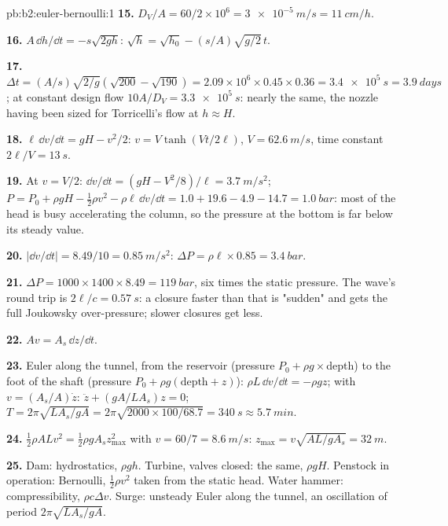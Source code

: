 \begin{solution}{pb:b2:euler-bernoulli:1}
\textbf{15.} $D_V/A = 60/2 \times 10^6 = \qty{3e-5}{m/s} = \qty{11}{cm/h}$.

\textbf{16.} $A\,\dd h/\dd t = -s\sqrt{2gh}$: $\sqrt h = \sqrt{h_0} - (s/A)\sqrt{g/2}\,t$.

\textbf{17.} $\Delta t = (A/s)\sqrt{2/g}(\sqrt{200} - \sqrt{190}) = 2.09 \times 10^6 \times
0.45 \times 0.36 = \qty{3.4e5}{s} = \qty{3.9}{days}$; at constant design flow
$10A/D_V = \qty{3.3e5}{s}$: nearly the same, the nozzle having been sized
for Torricelli's flow at $h \approx H$.

\textbf{18.} $\ell\,\dd v/\dd t = gH - v^2/2$: $v = V\tanh(Vt/2\ell)$, $V = \qty{62.6}{m/s}$,
time constant $2\ell/V = \qty{13}{s}$.

\textbf{19.} At $v = V/2$: $\dd v/\dd t = (gH - V^2/8)/\ell = \qty{3.7}{m/s^2}$;
$P = P_0 + \rho gH - \tfrac12\rho v^2 - \rho\ell\,\dd v/\dd t = 1.0 + 19.6 - 4.9 - 14.7
= \qty{1.0}{bar}$: most of the head is busy accelerating the column, so
the pressure at the bottom is far below its steady value.

\textbf{20.} $|\dd v/\dd t| = 8.49/10 = \qty{0.85}{m/s^2}$: $\Delta P = \rho\ell \times 0.85 =
\qty{3.4}{bar}$.

\textbf{21.} $\Delta P = 1000 \times 1400 \times 8.49 = \qty{119}{bar}$, six times the
static pressure. The wave's round trip is $2\ell/c = \qty{0.57}{s}$: a
closure faster than that is "sudden" and gets the full Joukowsky
over-pressure; slower closures get less.

\textbf{22.} $Av = A_s\,\dd z/\dd t$.

\textbf{23.} Euler along the tunnel, from the reservoir (pressure
$P_0 + \rho g\times$depth) to the foot of the shaft (pressure $P_0 + \rho g
(\text{depth} + z)$): $\rho L\,\dd v/\dd t = -\rho gz$; with $v = (A_s/A)\dot z$:
$\ddot z + (gA/LA_s)z = 0$; $T = 2\pi\sqrt{LA_s/gA} = 2\pi\sqrt{2000 \times 100/
68.7} = \qty{340}{s} \approx \qty{5.7}{min}$.

\textbf{24.} $\tfrac12\rho ALv^2 = \tfrac12\rho gA_sz_{\max}^2$ with $v = 60/7 =
\qty{8.6}{m/s}$: $z_{\max} = v\sqrt{AL/gA_s} = \qty{32}{m}$.

\textbf{25.} Dam: hydrostatics, $\rho gh$. Turbine, valves closed: the
same, $\rho gH$. Penstock in operation: Bernoulli, $\tfrac12\rho v^2$ taken
from the static head. Water hammer: compressibility, $\rho c\Delta v$.
Surge: unsteady Euler along the tunnel, an oscillation of period
$2\pi\sqrt{LA_s/gA}$.
\end{solution}

